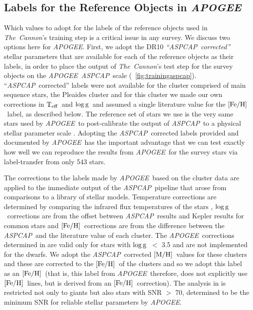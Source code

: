 \documentclass[12pt, preprint]{aastex}
\newcommand{\tc}{\textsl{The~Cannon}}
\newcommand{\apogee}{\textsl{APOGEE}}
\newcommand{\aspcap}{\textsl{ASPCAP}}
\newcommand{\teff}{\mbox{$\rm T_{eff}$}}
\newcommand{\feh}{\mbox{$\rm [Fe/H]$}}
\newcommand{\mh}{\mbox{$\rm [M/H]$}}
\newcommand{\logg}{\mbox{$\rm \log g$}}
\begin{document}
\subsection{Labels for the Reference Objects in \apogee}
\label{sec:ApogeeRefLabels}

Which values to adopt for the labels of the reference objects used in \tc 's training step is a critical issue
in any survey. We discuss two options here for \apogee . 
First, we adopt the DR10 \textit{``\aspcap\ corrected''} stellar parameters \citep{Meszaros2013} that are available for each of the reference objects as their labels, in order to place the output of \tc 's test step for the survey objects on the \apogee\ \aspcap\ scale (\figurename~\ref{fig:trainingaspcap}). ``\aspcap\ corrected'' labels were not available for the cluster comprised of main sequence stars, the Pleaides cluster and for this cluster we made our own corrections in \teff\ and \logg\ and assumed a single literature value for the \feh\ label, as described below. 
The reference set of stars we use is the very same stars used by \apogee\ to post-calibrate the output of \aspcap\ to a physical stellar parameter scale \citep{Meszaros2013}.
Adopting the \aspcap\ corrected labels provided and documented by \apogee\ has the important advantage 
that we can test exactly how well we can reproduce the results from \apogee\ for the survey stars via label-transfer from only 543 stars.

The corrections to the labels made by \apogee\ based on the cluster data are applied to the immediate output of the \aspcap\ pipeline that arose from comparisons to a library of stellar models.
Temperature corrections are determined by comparing the infrared flux temperatures of the stars \citep{gonzalez2009}, \logg\ corrections are from the offset between \aspcap\ results and Kepler results for common stars and \feh\ corrections are from the difference between the \aspcap\ and  the literature value of each cluster.  
The \apogee\ corrections determined in \citet{Meszaros2013} are valid only for stars with \logg\ $<$ 3.5 and are not implemented for the dwarfs.  We adopt the \aspcap\ corrected \mh\ values for these clusters and these are corrected to the \feh\ of the clusters and so we adopt this label as an \feh\ (that is, this label from \apogee\ therefore, does not explicitly use \feh\ lines, but is derived from an \feh\ correction). 
The analysis in \citet{Meszaros2013} is restricted not only to giants but also stars with SNR $>$ 70, determined to be the minimum SNR for reliable stellar parameters by \apogee.
\end{document}

